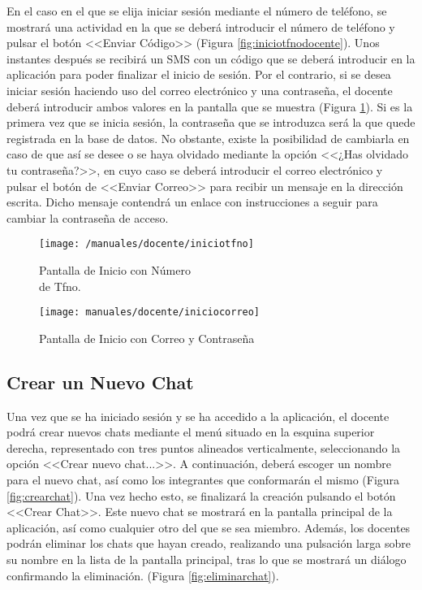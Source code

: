 En el caso en el que se elija iniciar sesión mediante el número de teléfono, se mostrará una actividad en la que se deberá introducir el número de teléfono y pulsar el botón <<Enviar Código>> (Figura \ref{fig:iniciotfnodocente}). Unos instantes después se recibirá un \acs{SMS} con un código que se deberá introducir en la aplicación para poder finalizar el inicio de sesión. Por el contrario, si se desea iniciar sesión haciendo uso del correo electrónico y una contraseña, el docente deberá introducir ambos valores en la pantalla que se muestra (Figura \ref{fig:iniciocorreodocente}). Si es la primera vez que se inicia sesión, la contraseña que se introduzca será la que quede registrada en la base de datos. No obstante, existe la posibilidad de cambiarla en caso de que así se desee o se haya olvidado mediante la opción <<¿Has olvidado tu contraseña?>>, en cuyo caso se deberá introducir el correo electrónico y pulsar el botón de <<Enviar Correo>> para recibir un mensaje en la dirección escrita. Dicho mensaje contendrá un enlace con instrucciones a seguir para cambiar la contraseña de acceso.

\begin{figure}[!h]
	\centering
	\begin{minipage}{.5\textwidth}
		\centering
		\texttt{[image: /manuales/docente/iniciotfno]}
		\caption{Pantalla de Inicio con Número \\ de Tfno.}
		\label{fig:iniciotfnodocente}
	\end{minipage}%
	\begin{minipage}{.5\textwidth}
		\centering
		\texttt{[image: manuales/docente/iniciocorreo]}
		\caption{Pantalla de Inicio con Correo y Contraseña}
		\label{fig:iniciocorreodocente}
	\end{minipage}
\end{figure}

\clearpage

\subsection*{Crear un Nuevo Chat}
Una vez que se ha iniciado sesión y se ha accedido a la aplicación, el docente podrá crear nuevos chats mediante el menú situado en la esquina superior derecha, representado con tres puntos alineados verticalmente, seleccionando la opción <<Crear nuevo chat...>>. A continuación, deberá escoger un nombre para el nuevo chat, así como los integrantes que conformarán el mismo (Figura \ref{fig:crearchat}). Una vez hecho esto, se finalizará la creación pulsando el botón <<Crear Chat>>. Este nuevo chat se mostrará en la pantalla principal de la aplicación, así como cualquier otro del que se sea miembro. Además, los docentes podrán eliminar los chats que hayan creado, realizando una pulsación larga sobre su nombre en la lista de la pantalla principal, tras lo que se mostrará un diálogo confirmando la eliminación. (Figura \ref{fig:eliminarchat}).

